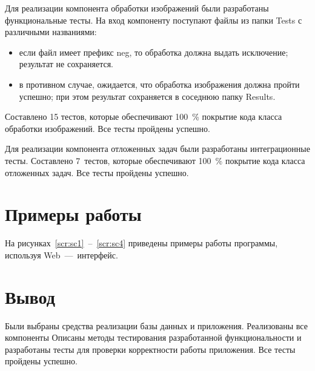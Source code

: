 Для реализации компонента обработки изображений были разработаны функциональные тесты. На вход компоненту поступают файлы из папки Tests с различными названиями:
\begin{itemize}
	\item если файл имеет префикс neg, то обработка должна выдать исключение; результат не сохраняется.
	\item в противном случае, ожидается, что обработка изображения должна пройти успешно; при этом результат сохраняется в соседнюю папку Results.
\end{itemize}
Составлено 15 тестов, которые обеспечивают 100~\% покрытие кода класса обработки изображений. Все тесты пройдены успешно.

Для реализации компонента отложенных задач были разработаны интеграционные тесты. Составлено 7~тестов, которые обеспечивают 100~\% покрытие кода класса отложенных задач. Все тесты пройдены успешно.



\section{Примеры работы}
На рисунках~\ref{scr:sc1}~--~\ref{scr:sc4} приведены примеры работы программы, используя Web~---~интерфейс.

\FloatBarrier

\section*{Вывод}

Были выбраны средства реализации базы данных и приложения. Реализованы все компоненты Описаны методы тестирования разработанной функциональности и разработаны тесты для проверки корректности работы приложения. Все тесты пройдены успешно.

\clearpage
